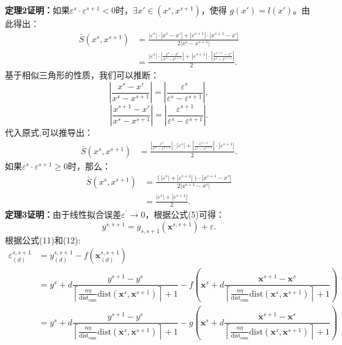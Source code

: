 \documentclass[12pt,a4paper]{article}%
\begin{document}
	\noindent\textbf{定理2证明：}如果$\varepsilon^s\cdot\varepsilon^{s+1}<0$时，$\exists x'\in(x^s,x^{s+1})$，使得
	$g(x')=l(x')$。由此得出：
	$$\begin{aligned}
		\bar{
		S}(x^s,x^{s+1})&=\frac{|\varepsilon^{s}|\cdot|x^{s}-x'|+|\varepsilon^{s+1}|\cdot|x^{s+1}-x'|}{2|x^s-x^{s+1}|}\\
		&=\frac{|\varepsilon^{s}|\cdot|\frac{x^s-x'}{x^{s}-x^{s+1}}|+|\varepsilon^{s+1}|\cdot|\frac{x^{s+1}-x'}{x^{s}-x^{s+1}}|}{2}.
		\end{aligned}$$
	基于相似三角形的性质，我们可以推断：
	$$|\frac{x^s-x'}{x^{s}-x^{s+1}}|=|\frac{\varepsilon^s}{\varepsilon^s-\varepsilon^{s+1}}|,$$
	$$|\frac{x^{s+1}-x'}{x^{s}-x^{s+1}}|=|\frac{\varepsilon^{s+1}}{\varepsilon^s-\varepsilon^{s+1}}|.$$
	代入原式,可以推导出：
	$$\begin{aligned}
		\bar{
		S}(x^s,x^{s+1})&=
		\frac{|\frac{\varepsilon^s}{\varepsilon^s-\varepsilon^{s+1}}|\cdot |\varepsilon^{s}|+|\frac{\varepsilon^{s+1}}{\varepsilon^s-\varepsilon^{s+1}}|\cdot|\varepsilon^{s+1}|}{2}.
		\end{aligned}$$
	如果$\varepsilon^s\cdot\varepsilon^{s+1}\ge0$时，那么：
	$$\begin{aligned}
		\bar{
		S}(x^s,x^{s+1})&=\frac{(|\varepsilon^s|+|\varepsilon^{s+1}|)\cdot|x^{s+1}-x^{s}|}{2|x^{s+1}-x^{s}|}\\&=
		\frac{|\varepsilon^s|+|\varepsilon^{s+1}|}{2}.
		\end{aligned}$$
	\noindent\textbf{定理3证明：}由于线性拟合误差$\varepsilon^\prime\rightarrow0$，根据公式(5)可得：
	$$y^{s,s+1}=g_{s,s+1}(\boldsymbol{x}^{s,s+1})+\varepsilon.$$
	根据公式(11)和(12):
	$$\begin{aligned}
		\varepsilon^{s,s+1}_{(d)}&=y_{(d)}^{s,s+1}-f(\boldsymbol{x}_{(d)}^{s,s+1})\\&=
		y^s+d\dfrac{y^{s+1}-y^{s}}{\left\lceil \frac{n\eta}{\text{dist}_{\text{sum}}}\text{dist}(\boldsymbol{x}^s,\boldsymbol{x}^{s+1})\right\rceil+1}-f{(\boldsymbol{x}^s+d\dfrac{\boldsymbol{x}^{s+1}-\boldsymbol{x}^{s}}{\left\lceil \frac{n\eta}{\text{dist}_{\text{sum}}}\text{dist}(\boldsymbol{x}^s,\boldsymbol{x}^{s+1})\right\rceil+1})}\\&=
		y^s+d\dfrac{y^{s+1}-y^{s}}{\left\lceil \frac{n\eta}{\text{dist}_{\text{sum}}}\text{dist}(\boldsymbol{x}^s,\boldsymbol{x}^{s+1})\right\rceil+1}-g{(\boldsymbol{x}^s+d\dfrac{\boldsymbol{x}^{s+1}-\boldsymbol{x}^{s}}{\left\lceil \frac{n\eta}{\text{dist}_{\text{sum}}}\text{dist}(\boldsymbol{x}^s,\boldsymbol{x}^{s+1})\right\rceil+1})}
		\end{aligned}$$
\end{document}
